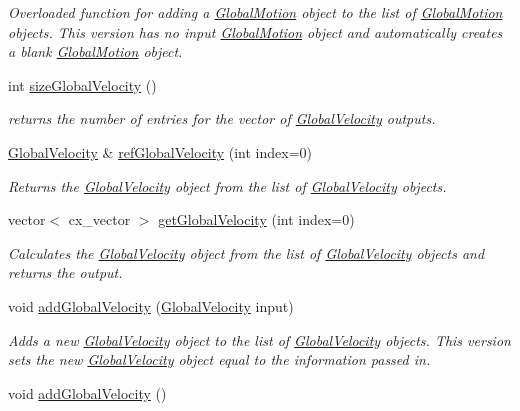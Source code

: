 \begin{DoxyCompactItemize}
\begin{DoxyCompactList}\small\item\em Overloaded function for adding a \hyperlink{class_global_motion}{Global\-Motion} object to the list of \hyperlink{class_global_motion}{Global\-Motion} objects. This version has no input \hyperlink{class_global_motion}{Global\-Motion} object and automatically creates a blank \hyperlink{class_global_motion}{Global\-Motion} object. \end{DoxyCompactList}\item 
int \hyperlink{class_outputs_body_af41b4423bd40c87fa87ae0af53bc96e5}{size\-Global\-Velocity} ()
\begin{DoxyCompactList}\small\item\em returns the number of entries for the vector of \hyperlink{class_global_velocity}{Global\-Velocity} outputs. \end{DoxyCompactList}\item 
\hyperlink{class_global_velocity}{Global\-Velocity} \& \hyperlink{class_outputs_body_a6728d42493b83db7d682ca751a8f080a}{ref\-Global\-Velocity} (int index=0)
\begin{DoxyCompactList}\small\item\em Returns the \hyperlink{class_global_velocity}{Global\-Velocity} object from the list of \hyperlink{class_global_velocity}{Global\-Velocity} objects. \end{DoxyCompactList}\item 
vector$<$ cx\-\_\-vector $>$ \hyperlink{class_outputs_body_a16d63ba2343caa9244a461fb3d539843}{get\-Global\-Velocity} (int index=0)
\begin{DoxyCompactList}\small\item\em Calculates the \hyperlink{class_global_velocity}{Global\-Velocity} object from the list of \hyperlink{class_global_velocity}{Global\-Velocity} objects and returns the output. \end{DoxyCompactList}\item 
void \hyperlink{class_outputs_body_abe974976080b1b9bfa3d66ffb89b0640}{add\-Global\-Velocity} (\hyperlink{class_global_velocity}{Global\-Velocity} input)
\begin{DoxyCompactList}\small\item\em Adds a new \hyperlink{class_global_velocity}{Global\-Velocity} object to the list of \hyperlink{class_global_velocity}{Global\-Velocity} objects. This version sets the new \hyperlink{class_global_velocity}{Global\-Velocity} object equal to the information passed in. \end{DoxyCompactList}\item 
\hypertarget{class_outputs_body_a07a548f3df9fa5aff4223a60f5f1b56c}{void \hyperlink{class_outputs_body_a07a548f3df9fa5aff4223a60f5f1b56c}{add\-Global\-Velocity} ()}\label{class_outputs_body_a07a548f3df9fa5aff4223a60f5f1b56c}


\end{DoxyCompactItemize}
